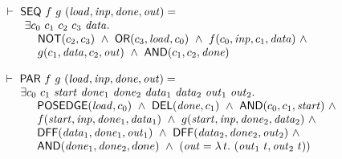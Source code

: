 \documentclass{llncs}
\begin{document}
\begin{footnotesize}
\smallskip

$
\begin{array}{l}
\TURNST\ \DEF{SEQ}\ f\ g\ (\VAR{load,inp,done,out}) = \\
\phantom{\TURNST\ ~~} \exists c_0~ c_1~ c_2~ c_3~ \VAR{data}.\\
\phantom{\TURNST\ ~~\exists~}                      \DEF{NOT} (c_2,c_3) \ \AND \ 
                      \DEF{OR} (c_3,\VAR{load},c_0) \ \AND \  f (c_0,\VAR{inp},c_1,\VAR{data}) \ \AND \\
\phantom{\TURNST\ ~~ \exists~} 
        g (c_1,\VAR{data},c_2,\VAR{out})\ \AND\ 
        \DEF{AND} (c_1,c_2,\VAR{done}) 
\end{array}
$

\smallskip

$
\begin{array}{l}
\TURNST\ \DEF{PAR}\ f\ g\ (\VAR{load,inp,done,out}) = \\
\phantom{\TURNST\ ~}     \exists c_0~c_1~\VAR{start}~\sVAR{done}{1}~\sVAR{done}{2}~
                                 \sVAR{data}{1}~\sVAR{data}{2}~\sVAR{out}{1}~\sVAR{out}{2}.\\
\phantom{\TURNST\ ~~ \exists~}
       \DEF{POSEDGE} (\VAR{load},c_0)\ \AND\  
       \DEF{DEL} (\VAR{done},c_1)\ \AND \ 
       \DEF{AND} (c_0,c_1,\VAR{start})\ \AND\\
\phantom{\TURNST\ ~~ \exists~}
       f (\VAR{start},\VAR{inp},\sVAR{done}{1},\sVAR{data}{1})\ \AND \ 
       g (\VAR{start},\VAR{inp},\sVAR{done}{2},\sVAR{data}{2})\ \AND\\
\phantom{\TURNST\ ~~ \exists~}
       \DEF{DFF} (\sVAR{data}{1},\sVAR{done}{1},\sVAR{out}{1})\ \AND \  
       \DEF{DFF} (\sVAR{data}{2},\sVAR{done}{2},\sVAR{out}{2})\ \AND\\
\phantom{\TURNST\ ~~ \exists~}
       \DEF{AND} (\sVAR{done}{1},\sVAR{done}{2},done)\ \AND \ 
       (\VAR{out} = \LAMBDA{t}{(\sVAR{out}{1}\ t,\sVAR{out}{2}\ t)})
\end{array}
$

\smallskip


\end{footnotesize}
\end{document}
